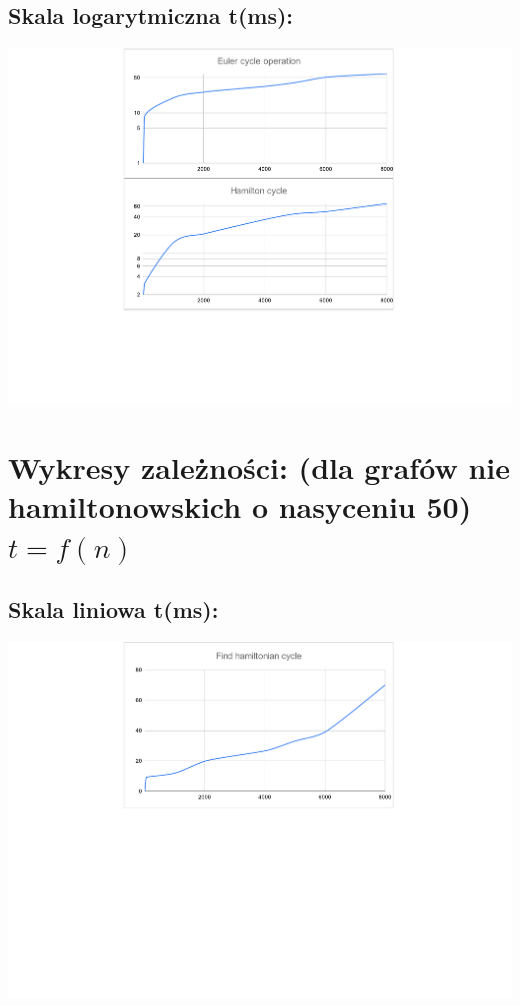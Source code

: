 \documentclass[12pt]{article}
\begin{document}
\subsection{Skala logarytmiczna t(ms): }

\begin{center}

\includegraphics[scale=0.5]{wykres_logarytmiczny_0.pdf}

\end{center}

\section{Wykresy zależności: (dla grafów nie hamiltonowskich o nasyceniu 50) $ t = f(n) $}

\subsection{Skala liniowa t(ms): }

\begin{center}

\includegraphics[scale=0.5]{wykres_liniowy_1.pdf}

\end{center}
\end{document}
